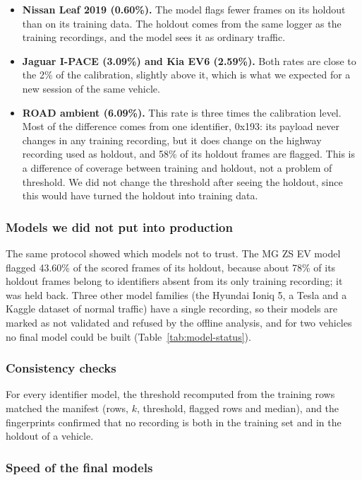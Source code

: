 \begin{itemize}
    \item \textbf{Nissan Leaf 2019 (0.60\%).} The model flags fewer frames on its holdout than on its training data. The holdout comes from the same logger as the training recordings, and the model sees it as ordinary traffic.
    \item \textbf{Jaguar I-PACE (3.09\%) and Kia EV6 (2.59\%).} Both rates are close to the 2\% of the calibration, slightly above it, which is what we expected for a new session of the same vehicle.
    \item \textbf{ROAD ambient (6.09\%).} This rate is three times the calibration level. Most of the difference comes from one identifier, 0x193: its payload never changes in any training recording, but it does change on the highway recording used as holdout, and 58\% of its holdout frames are flagged. This is a difference of coverage between training and holdout, not a problem of threshold. We did not change the threshold after seeing the holdout, since this would have turned the holdout into training data.
\end{itemize}

\subsubsection{Models we did not put into production}

The same protocol showed which models not to trust. The MG ZS EV model flagged 43.60\% of the scored frames of its holdout, because about 78\% of its holdout frames belong to identifiers absent from its only training recording; it was held back. Three other model families (the Hyundai Ioniq 5, a Tesla and a Kaggle dataset of normal traffic) have a single recording, so their models are marked as not validated and refused by the offline analysis, and for two vehicles no final model could be built (Table~\ref{tab:model-status}).

\subsubsection{Consistency checks}

For every identifier model, the threshold recomputed from the training rows matched the manifest (rows, $k$, threshold, flagged rows and median), and the fingerprints confirmed that no recording is both in the training set and in the holdout of a vehicle.

\subsubsection{Speed of the final models}
\label{sec:validation-speed}

